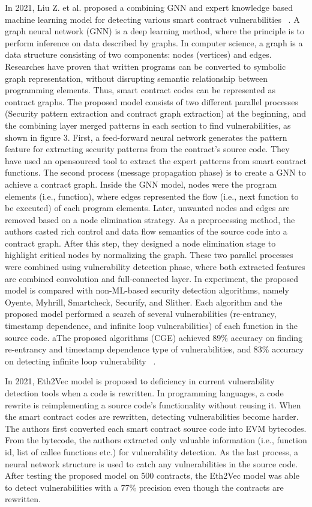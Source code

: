 In 2021, Liu Z. et al. proposed a combining GNN and expert knowledge based machine learning model for detecting various smart contract vulnerabilities ~\cite{hwang2020gap}.
A graph neural network (GNN) is a deep learning method, where the principle is to perform inference on data described by graphs.
In computer science, a graph is a data structure consisting of two components: nodes (vertices) and edges. Researches have proven that written programs can be converted to symbolic graph representation, without disrupting semantic relationship between programming elements.
Thus, smart contract codes can be represented as contract graphs.
The proposed model consists of two different parallel processes (Security pattern extraction and contract graph extraction) at the beginning, and the combining layer merged patterns in each section to find vulnerabilities, as shown in figure 3.
First, a feed-forward neural network generates the pattern feature for extracting security patterns from the contract's source code.
They have used an opensourced tool to extract the expert patterns from smart contract functions.
The second process (message propagation phase) is to create a GNN to achieve a contract graph.
Inside the GNN model, nodes were the program elements (i.e., function), where edges represented the flow (i.e., next function to be executed) of each program elements.
Later, unwanted nodes and edges are removed based on a node elimination strategy.
As a preprocessing method, the authors casted rich control and data flow semantics of the source code into a contract graph.
After this step, they designed a node elimination stage to highlight critical nodes by normalizing the graph.
These two parallel processes were combined using vulnerability detection phase, where both extracted features are combined convolution and full-connected layer.
In experiment, the proposed model is compared with non-ML-based security detection algorithms, namely Oyente, Myhrill, Smartcheck, Securify, and Slither.
Each algorithm and the proposed model performed a search of several vulnerabilities (re-entrancy, timestamp dependence, and infinite loop vulnerabilities) of each function in the source code.
aThe proposed algorithms (CGE) achieved 89\% accuracy on finding re-entrancy and timestamp dependence type of vulnerabilities, and 83\% accuracy on detecting infinite loop vulnerability ~\cite{hwang2020gap}.

In 2021, Eth2Vec model is proposed to deficiency in current vulnerability detection tools when a code is rewritten. In programming languages, a code rewrite is reimplementing a source code's functionality without reusing it.
When the smart contract codes are rewritten, detecting vulnerabilities become harder.
The authors first converted each smart contract source code into EVM bytecodes.
From the bytecode, the authors extracted only valuable information (i.e., function id, list of callee functions etc.) for vulnerability detection.
As the last process, a neural network structure is used to catch any vulnerabilities in the source code.
After testing the proposed model on 500 contracts, the Eth2Vec model was able to detect vulnerabilities with a 77\% precision even though the contracts are rewritten.

